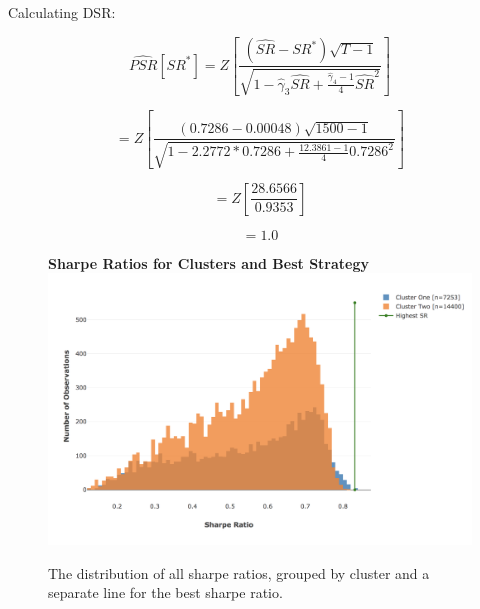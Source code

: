\documentclass[a4paper,11pt,oneside]{article}
\theoremstyle{plain}
\theoremstyle{definition}
\begin{document}
	Calculating DSR:
	
	\begin{equation}
	\widehat{P S R}\left[S R^{*}\right]=Z\left[\frac{\left(\widehat{S R}-S R^{*}\right) \sqrt{T-1}}{\sqrt{1-\hat{\gamma}_{3} \widehat{S R}+\frac{\hat{\gamma}_{4}-1}{4} \widehat{S R}^{2}}}\right]
	\end{equation}
	
	\begin{equation}
	=Z\left[\frac{\left({0.7286}-{0.00048}\right) \sqrt{1500-1}}{\sqrt{1-{2.2772}\ast{0.7286}+\frac{{12.3861}-1}{4}{0.7286}^{2}}}\right]
	\end{equation}
	
	\begin{equation}
	=Z\left[\frac{28.6566}{0.9353}\right]
	\end{equation}
	
	\begin{equation}
	= {1.0}
	\end{equation}
	
	\begin{figure}[H]
		\centering
		\textbf{Sharpe Ratios for Clusters and Best Strategy}
		\includegraphics[scale=0.35]{images/results/dsr/cluster_sr.png} 
		\caption{
			\newline The distribution of all sharpe ratios, grouped by cluster and a separate line for the best sharpe ratio.}
		\label{figure-dsr_sr}
	\end{figure}
	
\end{document}
